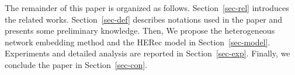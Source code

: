The remainder of this paper is organized as follows. Section~\ref{sec-rel} introduces the related works. Section~\ref{sec-def} describes notations used in the paper and presents some preliminary knowledge. Then, We propose the heterogeneous network embedding method and the HERec model in Section~\ref{sec-model}. Experiments and detailed analysis are reported in Section~\ref{sec-exp}. Finally, we conclude the paper in Section~\ref{sec-con}.

\begin{figure}[t]
\centering
{}
\end{figure}
